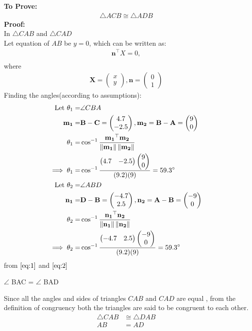 \documentclass{article}
\providecommand{\norm}[1]{\left\lVert#1\right\rVert}
\newcommand{\myvec}[1]{\ensuremath{\begin{pmatrix}#1\end{pmatrix}}}
\let\vec\mathbf
\begin{document}
\textbf{To Prove:}
	\begin{align}
		\triangle{ACB} \cong \triangle{ADB}
	\end{align}
\textbf{Proof:}\\
In $\triangle{CAB}$ and $\triangle{CAD}$\\
Let  equation of $AB$ be $y = 0$, which can be written as:
\begin{align}
\vec{n}^{\top}X = 0,\\
\end{align}
where
\begin{align}
\vec{X} = \myvec{x\\y},\vec{n} = \myvec{0\\1}
\end{align}
	Finding the angles(according to assumptions):
		\begin{align}
\text{Let }\theta_1=&\angle CBA\\
\vec{m_1}=&\vec{B}-\vec{C}=\myvec{4.7\\-2.5}, \vec{m_2}=\vec{B}-\vec{A}=\myvec{9\\0}\\
\theta_1=&\cos^{-1}\frac{\vec{m_1}^\top\vec{m_2}}{\norm{\vec{m_1}}\norm{\vec{m_2}}}\\
\implies\theta_1=&\cos^{-1}\frac{\myvec{4.7&-2.5}\myvec{9\\0}}{(9.2)(9)}=59.3\degree
\label{eq:1}\\
\text{Let }\theta_2=&\angle ABD\\
\vec{n_1}=&\vec{D}-\vec{B}=\myvec{-4.7\\2.5}, \vec{n_2}=\vec{A}-\vec{B}=\myvec{-9\\0}\\
\theta_2 =& \cos^{-1}\frac{\vec{n_1}^\top\vec{n_2}}{\norm{\vec{n_1}}\norm{\vec{n_2}}}\\
\implies\theta_2=&\cos^{-1}\frac{\myvec{-4.7&2.5}\myvec{-9\\0}}{(9.2)(9)}=59.3\degree
\label{eq:2}\\
\end{align}
from $\eqref{eq:1}$ and $\eqref{eq:2}$
\begin{center}
$\angle$ BAC = $\angle$ BAD 
\end{center}
Since all the angles and sides of triangles $CAB$ and $CAD$ are equal , from the definition of congruency both the triangles are said to be congruent to each other.
\begin{align}
	\triangle{CAB} &\cong \triangle{DAB}\\
	AB &= AD 
\end{align}
\end{document}
